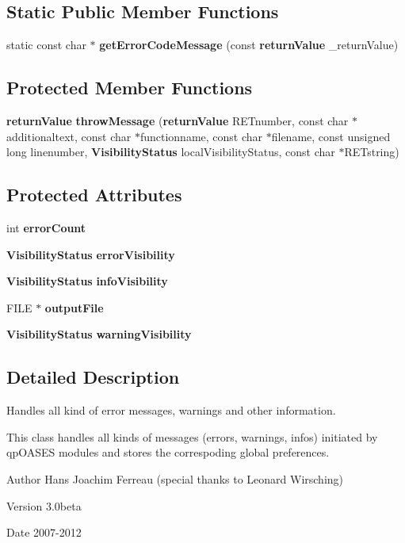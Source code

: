 \subsection*{Static Public Member Functions}
\begin{DoxyCompactItemize}
\item 
static const char $\ast$ {\bf getErrorCodeMessage} (const {\bf returnValue} \_\-returnValue)
\end{DoxyCompactItemize}
\subsection*{Protected Member Functions}
\begin{DoxyCompactItemize}
\item 
{\bf returnValue} {\bf throwMessage} ({\bf returnValue} RETnumber, const char $\ast$additionaltext, const char $\ast$functionname, const char $\ast$filename, const unsigned long linenumber, {\bf VisibilityStatus} localVisibilityStatus, const char $\ast$RETstring)
\end{DoxyCompactItemize}
\subsection*{Protected Attributes}
\begin{DoxyCompactItemize}
\item 
int {\bf errorCount}
\item 
{\bf VisibilityStatus} {\bf errorVisibility}
\item 
{\bf VisibilityStatus} {\bf infoVisibility}
\item 
FILE $\ast$ {\bf outputFile}
\item 
{\bf VisibilityStatus} {\bf warningVisibility}
\end{DoxyCompactItemize}


\subsection{Detailed Description}
Handles all kind of error messages, warnings and other information. 

This class handles all kinds of messages (errors, warnings, infos) initiated by qpOASES modules and stores the correspoding global preferences.

\begin{DoxyAuthor}{Author}
Hans Joachim Ferreau (special thanks to Leonard Wirsching) 
\end{DoxyAuthor}
\begin{DoxyVersion}{Version}
3.0beta 
\end{DoxyVersion}
\begin{DoxyDate}{Date}
2007-\/2012 
\end{DoxyDate}


